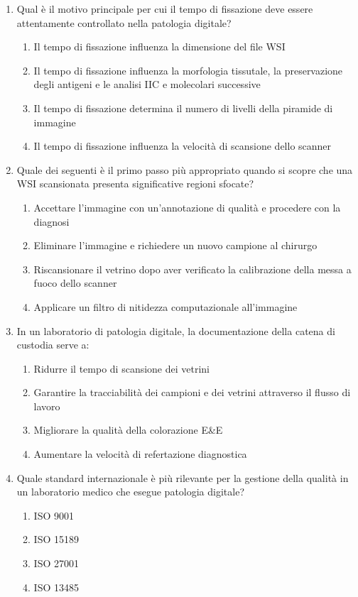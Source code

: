 \begin{enumerate}
    \item \label{ch2:q7} Qual è il motivo principale per cui il tempo di fissazione deve essere
    attentamente controllato nella patologia digitale?
    \begin{enumerate}[label=\Alph*.]
        \item Il tempo di fissazione influenza la dimensione del file WSI
        \item Il tempo di fissazione influenza la morfologia tissutale, la preservazione degli
        antigeni e le analisi IIC e molecolari successive
        \item Il tempo di fissazione determina il numero di livelli della piramide di immagine
        \item Il tempo di fissazione influenza la velocità di scansione dello scanner
    \end{enumerate}

    \item \label{ch2:q8} Quale dei seguenti è il primo passo più appropriato quando si scopre che
    una WSI scansionata presenta significative regioni sfocate?
    \begin{enumerate}[label=\Alph*.]
        \item Accettare l'immagine con un'annotazione di qualità e procedere con la diagnosi
        \item Eliminare l'immagine e richiedere un nuovo campione al chirurgo
        \item Riscansionare il vetrino dopo aver verificato la calibrazione della messa a fuoco
        dello scanner
        \item Applicare un filtro di nitidezza computazionale all'immagine
    \end{enumerate}

    \item \label{ch2:q9} In un laboratorio di patologia digitale, la documentazione della catena
    di custodia serve a:
    \begin{enumerate}[label=\Alph*.]
        \item Ridurre il tempo di scansione dei vetrini
        \item Garantire la tracciabilità dei campioni e dei vetrini attraverso il flusso di lavoro
        \item Migliorare la qualità della colorazione E\&E
        \item Aumentare la velocità di refertazione diagnostica
    \end{enumerate}

    \item \label{ch2:q10} Quale standard internazionale è più rilevante per la gestione della
    qualità in un laboratorio medico che esegue patologia digitale?
    \begin{enumerate}[label=\Alph*.]
        \item ISO 9001
        \item ISO 15189
        \item ISO 27001
        \item ISO 13485
    \end{enumerate}

\end{enumerate}

\begin{figure}[htbp]
  \centering
  
  \label{fig:mindmap_ch2}
\end{figure}